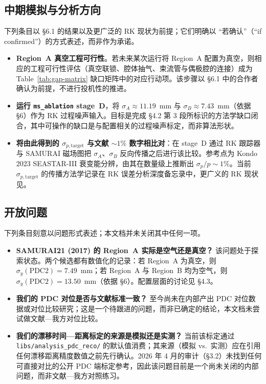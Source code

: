 \documentclass[a4paper, 11pt]{article}
\begin{document}
\subsection{中期模拟与分析方向}
下列条目以 §6.1 的结果以及更广泛的 RK 现状为前提；它们明确以 ``若确认''（``if confirmed''）的方式表述，而非作为承诺。
\begin{itemize}
  \item \textbf{Region~A 真空工程可行性}。若未来某次运行将 Region~A 配置为真空，则相应的工程可行性评估（真空联锁、腔体抽气、束流管与偶极腔的连接）成为 Table~\ref{tab:gap-matrix} 缺口矩阵中的对应行动项。该步骤以 §6.1 中的合作者确认为前提，不进行投机性的推进。
  \item \textbf{运行 \texttt{ms\_ablation} stage~D}，将 $\sigma_A \approx 11.19$~mm 与 $\sigma_B \approx 7.43$~mm（依据 §6）作为 RK 过程噪声输入。目标是完成 §4.2 第 3 段所标识的方法学缺口闭合，其中可操作的缺口是与配置相关的过程噪声标定，而非算法形状。
  \item \textbf{将由此得到的 $\sigma_{p,\text{target}}$ 与文献 $\sim 1\%$ 数字相比对}：在 stage~D 通过 RK 跟踪器与 SAMURAI 磁场图把 $\sigma_A$、$\sigma_B$ 反向传播之后进行该比较。参考点为 Kondo 2023 SEASTAR-III 衰变能分辨，由其在数量级上推断出 $\sigma_p/p \sim 1\%$。当前 $\sigma_{p,\text{target}}$ 的传播方法学记录在 RK 误差分析深度备忘录中，更广义的 RK 现状见。
\end{itemize}

\subsection{开放问题}
下列条目刻意以问题形式表述；本文档并未关闭其中任何一项。
\begin{itemize}
  \item \textbf{SAMURAI21 (2017) 的 Region~A 实际是空气还是真空？} 该问题处于探索状态。两个候选都有数值化的记录：若 Region~A 为真空，则 $\sigma_y(\text{PDC2}) = 7.49$~mm；若 Region~A 与 Region~B 均为空气，则 $\sigma_y(\text{PDC2}) = 13.50$~mm（依据 §6）。配置层面的讨论见 §4.3。
  \item \textbf{我们的 PDC 对位是否与文献标准一致？} 至今尚未在内部产出 PDC 对位数据或对位比较研究；这是一个待跟进的问题，而非已确定的结论，本文档未尝试做文献—我方对位比较。
  \item \textbf{我们的漂移时间—距离标定的来源是模拟还是实测？} 当前该标定通过 \texttt{libs/analysis\_pdc\_reco/} 的默认值消费；其来源（模拟 vs.\ 实测）应在引用任何漂移距离精度数值之前先行确认。2026 年 4 月的审计（§3.2）未找到任何可直接对比的公开 PDC 端标定参考，因此该问题目前是一个尚未关闭的内部问题，而非文献—我方对照练习。
\end{itemize}
\end{document}
